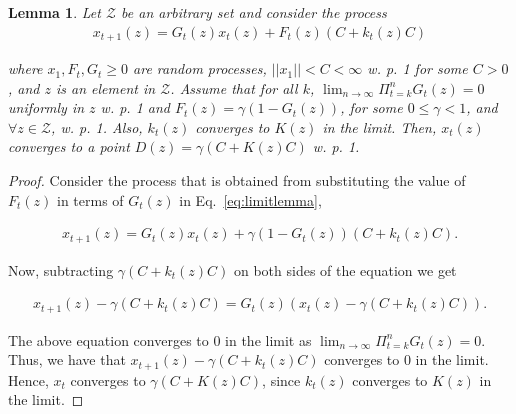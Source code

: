 \documentclass[jair, twoside,11pt,theapa]{article}
\newtheorem{lemm2}{Lemma}
\begin{document}
\begin{lemm2}

Let $\mathcal{Z}$ be an arbitrary set and consider the process
\begin{equation*}
    \begin{array}{l}
         x_{t+1}(z) = G_t(z)x_t(z) + F_t(z) (C + k_t(z) C)
    \end{array}{}
\end{equation*}


\noindent where $x_1, F_t, G_t \geq 0 $ are random processes,  $||x_1|| < C < \infty$ w. p. 1 for some $C>0$, and $z$ is an element in $\mathcal{Z}$. Assume that for all $k$, $\lim_{n \xrightarrow{} \infty} \Pi_{t=k}^n G_t(z) = 0$ uniformly in $z$ w. p. 1 and $F_t(z) = \gamma(1 - G_t(z))$, for some $0 \leq \gamma < 1$, and $\forall z \in \mathcal{Z}$,  w. p. 1. Also, $k_t(z)$ converges to $K(z)$ in the limit. Then, $x_t(z)$ converges to a point $D(z) = \gamma(C + K(z)C)$ w. p. 1. 


\end{lemm2}

\begin{proof}

Consider the process that is obtained from substituting the value of $F_t(z)$ in terms of $G_t(z)$ in Eq.~\ref{eq:limitlemma},

\begin{equation}\label{eq:limitlemma2}
    \begin{array}{l}
         x_{t+1}(z) = G_t(z)x_t(z) + \gamma(1 - G_t(z)) (C + k_t(z) C).
    \end{array}{}
\end{equation}

Now, subtracting $\gamma (C + k_t(z)C)$ on both sides of the equation we get 

\begin{equation}\label{eq:limitlemma3}
    \begin{array}{l}
         x_{t+1}(z) - \gamma (C + k_t(z)C) =  G_t(z)(x_t(z) - \gamma (C + k_t(z) C)).
    \end{array}{}
\end{equation}

The above equation converges to 0 in the limit as $\lim_{n \xrightarrow{} \infty} \Pi_{t=k}^n G_t(z) = 0$. Thus, we have that $x_{t+1}(z) - \gamma (C + k_t(z)C)$ converges to 0 in the limit. Hence, $x_t$ converges to $\gamma (C + K(z)C)$, since $k_t(z)$ converges to $K(z)$ in the limit. 

\end{proof}
\end{document}
